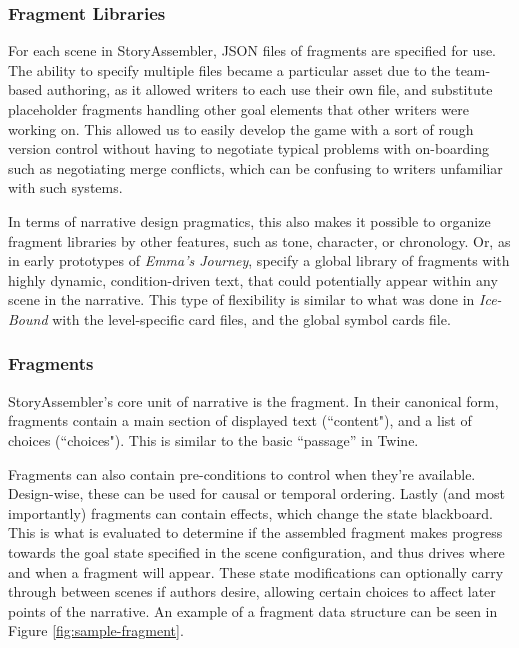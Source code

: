\subsubsection{Fragment Libraries}

For each scene in StoryAssembler, JSON files of fragments are specified for use. The ability to specify multiple files became a particular asset due to the team-based authoring, as it allowed writers to each use their own file, and substitute placeholder fragments handling other goal elements that other writers were working on. This allowed us to easily develop the game with a sort of rough version control without having to negotiate typical problems with on-boarding such as negotiating merge conflicts, which can be confusing to writers unfamiliar with such systems.

In terms of narrative design pragmatics, this also makes it possible to organize fragment libraries by other features, such as tone, character, or chronology. Or, as in early prototypes of \textit{Emma's Journey}, specify a global library of fragments with highly dynamic, condition-driven text, that could potentially appear within any scene in the narrative. This type of flexibility is similar to what was done in \textit{Ice-Bound} with the level-specific card files, and the global symbol cards file.

\subsubsection{Fragments}

StoryAssembler's core unit of narrative is the fragment. In their canonical form, fragments contain a main section of displayed text (``content"), and a list of choices (``choices"). This is similar to the basic ``passage'' in Twine.

Fragments can also contain pre-conditions to control when they're available. Design-wise, these can be used for causal or temporal ordering. Lastly (and most importantly) fragments can contain effects, which change the state blackboard. This is what is evaluated to determine if the assembled fragment makes progress towards the goal state specified in the scene configuration, and thus drives where and when a fragment will appear. These state modifications can optionally carry through between scenes if authors desire, allowing certain choices to affect later points of the narrative. An example of a fragment data structure can be seen in Figure \ref{fig:sample-fragment}.

